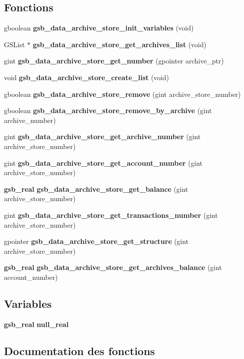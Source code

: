 \subsection*{Fonctions}
\begin{DoxyCompactItemize}
\item 
gboolean {\bf gsb\_\-data\_\-archive\_\-store\_\-init\_\-variables} (void)
\item 
GSList $\ast$ {\bf gsb\_\-data\_\-archive\_\-store\_\-get\_\-archives\_\-list} (void)
\item 
gint {\bf gsb\_\-data\_\-archive\_\-store\_\-get\_\-number} (gpointer archive\_\-ptr)
\item 
void {\bf gsb\_\-data\_\-archive\_\-store\_\-create\_\-list} (void)
\item 
gboolean {\bf gsb\_\-data\_\-archive\_\-store\_\-remove} (gint archive\_\-store\_\-number)
\item 
gboolean {\bf gsb\_\-data\_\-archive\_\-store\_\-remove\_\-by\_\-archive} (gint archive\_\-number)
\item 
gint {\bf gsb\_\-data\_\-archive\_\-store\_\-get\_\-archive\_\-number} (gint archive\_\-store\_\-number)
\item 
gint {\bf gsb\_\-data\_\-archive\_\-store\_\-get\_\-account\_\-number} (gint archive\_\-store\_\-number)
\item 
{\bf gsb\_\-real} {\bf gsb\_\-data\_\-archive\_\-store\_\-get\_\-balance} (gint archive\_\-store\_\-number)
\item 
gint {\bf gsb\_\-data\_\-archive\_\-store\_\-get\_\-transactions\_\-number} (gint archive\_\-store\_\-number)
\item 
gpointer {\bf gsb\_\-data\_\-archive\_\-store\_\-get\_\-structure} (gint archive\_\-store\_\-number)
\item 
{\bf gsb\_\-real} {\bf gsb\_\-data\_\-archive\_\-store\_\-get\_\-archives\_\-balance} (gint account\_\-number)
\end{DoxyCompactItemize}
\subsection*{Variables}
\begin{DoxyCompactItemize}
\item 
{\bf gsb\_\-real} {\bf null\_\-real}
\end{DoxyCompactItemize}


\subsection{Documentation des fonctions}
